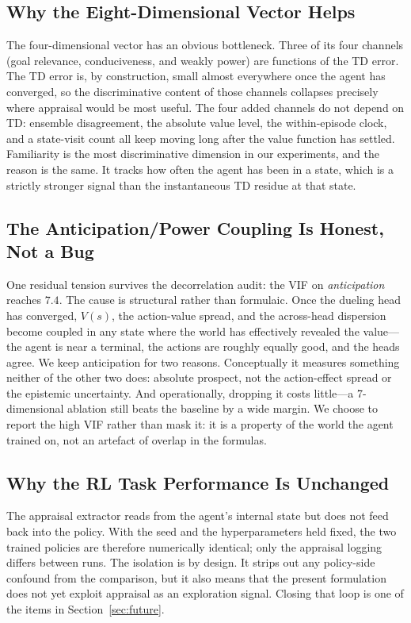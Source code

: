\documentclass[conference]{IEEEtran}
\begin{document}
\subsection{Why the Eight-Dimensional Vector Helps}
The four-dimensional vector has an obvious bottleneck. Three of its four
channels (goal relevance, conduciveness, and weakly power) are
functions of the TD error. The TD error is, by construction, small
almost everywhere once the agent has converged, so the discriminative
content of those channels collapses precisely where appraisal would be
most useful. The four added channels do not depend on TD: ensemble
disagreement, the absolute value level, the within-episode clock, and a
state-visit count all keep moving long after the value function has
settled. Familiarity is the most discriminative dimension in our
experiments, and the reason is the same. It tracks how often the agent
has been in a state, which is a strictly stronger signal than the
instantaneous TD residue at that state.

\subsection{The Anticipation/Power Coupling Is Honest, Not a Bug}
One residual tension survives the decorrelation audit: the VIF on
\emph{anticipation} reaches $7.4$. The cause is structural rather than
formulaic. Once the dueling head has converged, $V(s)$, the action-value
spread, and the across-head dispersion become coupled in any state
where the world has effectively revealed the value---the agent is near
a terminal, the actions are roughly equally good, and the heads
agree. We keep anticipation for two reasons. Conceptually it measures
something neither of the other two does: absolute prospect, not the
action-effect spread or the epistemic uncertainty. And operationally,
dropping it costs little---a 7-dimensional ablation still beats the
baseline by a wide margin. We choose to report the high VIF rather than
mask it: it is a property of the world the agent trained on, not an
artefact of overlap in the formulas.

\subsection{Why the RL Task Performance Is Unchanged}
The appraisal extractor reads from the agent's internal state but does
not feed back into the policy. With the seed and the hyperparameters
held fixed, the two trained policies are therefore numerically
identical; only the appraisal logging differs between runs. The
isolation is by design. It strips out any policy-side confound from
the comparison, but it also means that the present formulation does
not yet exploit appraisal as an exploration signal. Closing that loop
is one of the items in Section~\ref{sec:future}.
\end{document}
